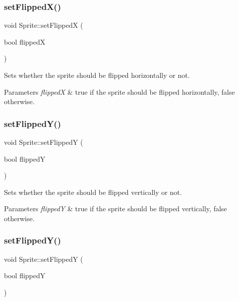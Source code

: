 \subsubsection{\texorpdfstring{set\+Flipped\+X()}{setFlippedX()}\hspace{0.1cm}{\footnotesize\ttfamily [2/2]}}
{\footnotesize\ttfamily void Sprite\+::set\+FlippedX (\begin{DoxyParamCaption}\item[{bool}]{flippedX }\end{DoxyParamCaption})}

Sets whether the sprite should be flipped horizontally or not.


\begin{DoxyParams}{Parameters}
{\em flippedX} & true if the sprite should be flipped horizontally, false otherwise. \\
\hline
\end{DoxyParams}
\mbox{\label{classSprite_ae0225a6dac4a1130bafff4619652b389}} 
\subsubsection{\texorpdfstring{set\+Flipped\+Y()}{setFlippedY()}\hspace{0.1cm}{\footnotesize\ttfamily [1/2]}}
{\footnotesize\ttfamily void Sprite\+::set\+FlippedY (\begin{DoxyParamCaption}\item[{bool}]{flippedY }\end{DoxyParamCaption})}

Sets whether the sprite should be flipped vertically or not.


\begin{DoxyParams}{Parameters}
{\em flippedY} & true if the sprite should be flipped vertically, false otherwise. \\
\hline
\end{DoxyParams}
\mbox{\label{classSprite_ae0225a6dac4a1130bafff4619652b389}} 
\subsubsection{\texorpdfstring{set\+Flipped\+Y()}{setFlippedY()}\hspace{0.1cm}{\footnotesize\ttfamily [2/2]}}
{\footnotesize\ttfamily void Sprite\+::set\+FlippedY (\begin{DoxyParamCaption}\item[{bool}]{flippedY }\end{DoxyParamCaption})}

